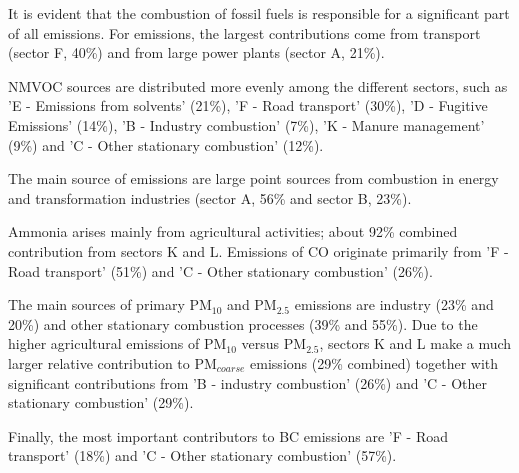 It is evident that the combustion of fossil fuels is responsible for a significant part of all emissions. For \nox emissions, the largest contributions come from transport (sector F, 40\%) and from large power plants (sector A, 21\%).

NMVOC sources are distributed more evenly among the different sectors,
such as 'E - Emissions from solvents' (21\%), 'F - Road transport' (30\%), 'D - Fugitive Emissions' (14\%), 'B - Industry combustion' (7\%), 'K - Manure management' (9\%) and 'C - Other stationary combustion' (12\%).


The main source of  \sox emissions are large point sources from combustion in energy and transformation industries (sector A, 56\% and sector B, 23\%).

Ammonia arises mainly from agricultural activities; about 92\% combined contribution from sectors K and L. Emissions of CO  originate primarily from 'F - Road transport' (51\%) and 'C - Other stationary combustion'  (26\%). 

The main sources of primary PM$_{10}$ and PM$_{2.5}$ emissions  are industry (23\% and 20\%) and other stationary combustion processes (39\% and 55\%). Due to the higher agricultural emissions of PM$_{10}$ versus PM$_{2.5}$, sectors K and L make a much larger relative contribution to PM$_{coarse}$ emissions (29\% combined) together with significant contributions from 'B - industry combustion' (26\%) and 'C - Other stationary combustion' (29\%). 

Finally, the most important contributors to BC emissions are 'F - Road transport' (18\%) and 'C - Other stationary combustion' (57\%).

